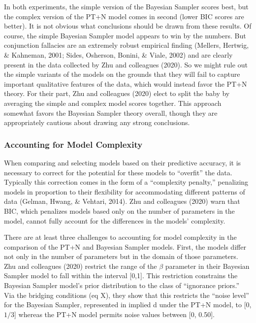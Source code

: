 \documentclass[
  english,
  man,floatsintext]{apa6}
\begin{document}
In both experiments, the simple version of the Bayesian Sampler scores best, but the complex version of the PT+N model comes in second (lower BIC scores are better). It is not obvious what conclusions should be drawn from these results. Of course, the simple Bayesian Sampler model appears to win by the numbers. But conjunction fallacies are an extremely robust empirical finding (Mellers, Hertwig, \& Kahneman, 2001; Sides, Osherson, Bonini, \& Viale, 2002) and are clearly present in the data collected by Zhu and colleagues (2020). So we might rule out the simple variants of the models on the grounds that they will fail to capture important qualitative features of the data, which would instead favor the PT+N theory. For their part, Zhu and colleagues (2020) elect to split the baby by averaging the simple and complex model scores together. This approach somewhat favors the Bayesian Sampler theory overall, though they are appropriately cautious about drawing any strong conclusions.

\hypertarget{accounting-for-model-complexity}{%
\subsubsection{Accounting for Model Complexity}\label{accounting-for-model-complexity}}

When comparing and selecting models based on their predictive accuracy, it is necessary to correct for the potential for these models to ``overfit'' the data. Typically this correction comes in the form of a ``complexity penalty,'' penalizing models in proportion to their flexibility for accommodating different patterns of data (Gelman, Hwang, \& Vehtari, 2014). Zhu and colleagues (2020) warn that BIC, which penalizes models based only on the number of parameters in the model, cannot fully account for the differences in the models' complexity.

There are at least three challenges to accounting for model complexity in the comparison of the PT+N and Bayesian Sampler models. First, the models differ not only in the number of parameters but in the domain of those parameters. Zhu and colleagues (2020) restrict the range of the \(\beta\) parameter in their Bayesian Sampler model to fall within the interval {[}0,1{]}. This restriction constrains the Bayesian Sampler model's prior distribution to the class of ``ignorance priors.'' Via the bridging conditions (eq X), they show that this restricts the ``noise level'' for the Bayesian Sampler, represented in implied d under the PT+N model, to {[}0, \(1/3\){]} whereas the PT+N model permits noise values between {[}0, 0.50{]}.
\end{document}
